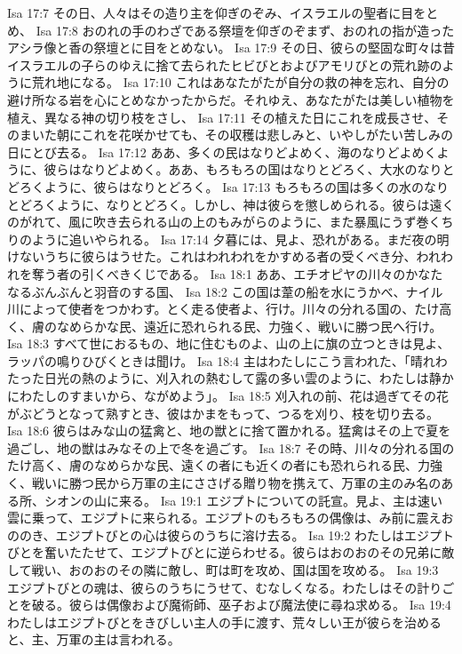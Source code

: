 Isa 17:7  その日、人々はその造り主を仰ぎのぞみ、イスラエルの聖者に目をとめ、
Isa 17:8  おのれの手のわざである祭壇を仰ぎのぞまず、おのれの指が造ったアシラ像と香の祭壇とに目をとめない。
Isa 17:9  その日、彼らの堅固な町々は昔イスラエルの子らのゆえに捨て去られたヒビびとおよびアモリびとの荒れ跡のように荒れ地になる。
Isa 17:10  これはあなたがたが自分の救の神を忘れ、自分の避け所なる岩を心にとめなかったからだ。それゆえ、あなたがたは美しい植物を植え、異なる神の切り枝をさし、
Isa 17:11  その植えた日にこれを成長させ、そのまいた朝にこれを花咲かせても、その収穫は悲しみと、いやしがたい苦しみの日にとび去る。
Isa 17:12  ああ、多くの民はなりどよめく、海のなりどよめくように、彼らはなりどよめく。ああ、もろもろの国はなりとどろく、大水のなりとどろくように、彼らはなりとどろく。
Isa 17:13  もろもろの国は多くの水のなりとどろくように、なりとどろく。しかし、神は彼らを懲しめられる。彼らは遠くのがれて、風に吹き去られる山の上のもみがらのように、また暴風にうず巻くちりのように追いやられる。
Isa 17:14  夕暮には、見よ、恐れがある。まだ夜の明けないうちに彼らはうせた。これはわれわれをかすめる者の受くべき分、われわれを奪う者の引くべきくじである。
Isa 18:1  ああ、エチオピヤの川々のかなたなるぶんぶんと羽音のする国、
Isa 18:2  この国は葦の船を水にうかべ、ナイル川によって使者をつかわす。とく走る使者よ、行け。川々の分れる国の、たけ高く、膚のなめらかな民、遠近に恐れられる民、力強く、戦いに勝つ民へ行け。
Isa 18:3  すべて世におるもの、地に住むものよ、山の上に旗の立つときは見よ、ラッパの鳴りひびくときは聞け。
Isa 18:4  主はわたしにこう言われた、「晴れわたった日光の熱のように、刈入れの熱むして露の多い雲のように、わたしは静かにわたしのすまいから、ながめよう」。
Isa 18:5  刈入れの前、花は過ぎてその花がぶどうとなって熟すとき、彼はかまをもって、つるを刈り、枝を切り去る。
Isa 18:6  彼らはみな山の猛禽と、地の獣とに捨て置かれる。猛禽はその上で夏を過ごし、地の獣はみなその上で冬を過ごす。
Isa 18:7  その時、川々の分れる国のたけ高く、膚のなめらかな民、遠くの者にも近くの者にも恐れられる民、力強く、戦いに勝つ民から万軍の主にささげる贈り物を携えて、万軍の主のみ名のある所、シオンの山に来る。
Isa 19:1  エジプトについての託宣。見よ、主は速い雲に乗って、エジプトに来られる。エジプトのもろもろの偶像は、み前に震えおののき、エジプトびとの心は彼らのうちに溶け去る。
Isa 19:2  わたしはエジプトびとを奮いたたせて、エジプトびとに逆らわせる。彼らはおのおのその兄弟に敵して戦い、おのおのその隣に敵し、町は町を攻め、国は国を攻める。
Isa 19:3  エジプトびとの魂は、彼らのうちにうせて、むなしくなる。わたしはその計りごとを破る。彼らは偶像および魔術師、巫子および魔法使に尋ね求める。
Isa 19:4  わたしはエジプトびとをきびしい主人の手に渡す、荒々しい王が彼らを治めると、主、万軍の主は言われる。
